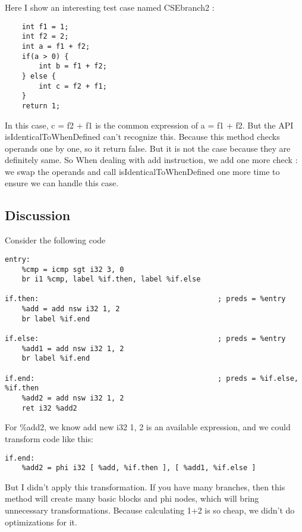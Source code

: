 Here I show an interesting test case named CSEbranch2 :
	
\begin{verbatim}
	int f1 = 1;
	int f2 = 2;
	int a = f1 + f2;
	if(a > 0) {
	    int b = f1 + f2;
	} else {
	    int c = f2 + f1;
	}
	return 1;
\end{verbatim}

In this case, c = f2 + f1 is the common expression of a = f1 + f2. But the API isIdenticalToWhenDefined can't recognize this. Because this method checks operands one by one, so it return false. But it is not the case because they are definitely same. So When dealing with add instruction, we add one more check : we swap the operands and call isIdenticalToWhenDefined one more time to ensure we can handle this case.

\subsection{Discussion}
Consider the following code
\begin{verbatim}
entry:
    %cmp = icmp sgt i32 3, 0
    br i1 %cmp, label %if.then, label %if.else

if.then:                                          ; preds = %entry
    %add = add nsw i32 1, 2
    br label %if.end

if.else:                                          ; preds = %entry
    %add1 = add nsw i32 1, 2
    br label %if.end

if.end:                                           ; preds = %if.else, %if.then
    %add2 = add nsw i32 1, 2
    ret i32 %add2
\end{verbatim}
For \%add2, we know add new i32 1, 2 is an available expression, and we could transform code like this:
\begin{verbatim}
if.end:
    %add2 = phi i32 [ %add, %if.then ], [ %add1, %if.else ]
\end{verbatim}
But I didn't apply this transformation. If you have many branches, then this method will create many basic blocks and phi nodes, which will bring unnecessary transformations. Because calculating 1+2 is so cheap, we didn't do optimizations for it.